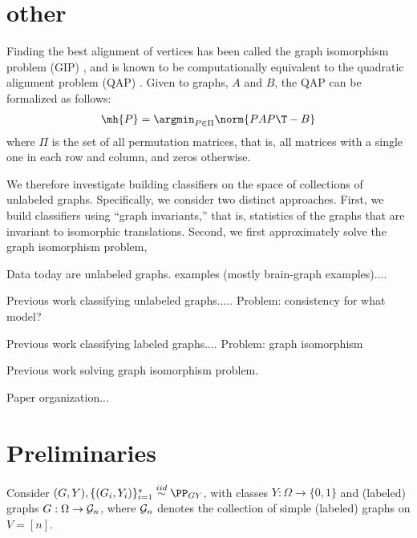 

\section{other} %
\label{sec:other}





Finding the best alignment of vertices has been called the graph isomorphism problem (GIP) \cite{??}, and is known to be computationally equivalent to the quadratic alignment problem (QAP) \cite{??}.  Given to graphs, $A$ and $B$, the QAP can be formalized as follows:
\begin{align}
	\mh{P} = \argmin_{P \in \Pi} \norm{PAP\T - B}
\end{align}
where $\Pi$ is the set of all permutation matrices, that is, all matrices with a single one in each row and column, and zeros otherwise.  


We therefore investigate building classifiers on the space of collections of unlabeled graphs.  Specifically, we consider two distinct approaches. First, we build classifiers using ``graph invariants,'' that is, statistics of the graphs that are invariant to isomorphic translations.  Second, we first approximately solve the graph isomorphism problem,  





Data today are unlabeled graphs.  examples (mostly brain-graph examples)....

Previous work classifying unlabeled graphs..... Problem: consistency for what model?

Previous work classifying labeled graphs.... Problem: graph isomorphism

Previous work solving graph isomorphism problem.

Paper organization...

\section{Preliminaries} %
\label{sec:preliminaries}



Consider $(G,Y),\{(G_i,Y_i)\}_{i=1}^s \overset{iid}{\sim} \PP_{GY}$,
with classes $Y:\Omega \rightarrow \{0,1\}$ and
(labeled) graphs $G:\Omega \rightarrow \mathcal{G}_n$,
where $\mathcal{G}_n$ denotes the collection of simple (labeled) graphs on $V=[n]$.

